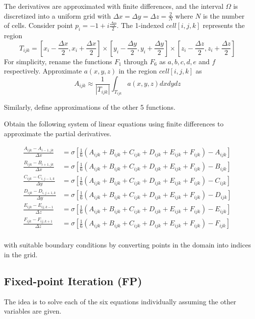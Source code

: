\documentclass[11pt,titlepage]{article}
\begin{document}
The derivatives are approximated with finite differences, and the interval $\Omega$ is discretized into a uniform grid
with $\Delta x = \Delta y = \Delta z = \frac{2}{N}$ where $N$ is the number of cells.
Consider point $p_i = -1 + i\frac{\Delta p}{2}$.
The 1-indexed $cell[i, j, k]$ represents the region
$$
T_{ijk} = [x_i - \frac{\Delta x}{2}, x_i + \frac{\Delta x}{2}] \times
[y_i - \frac{\Delta y}{2}, y_i + \frac{\Delta y}{2}] \times
[z_i - \frac{\Delta z}{2}, z_i + \frac{\Delta z}{2}]
$$
For simplicity, rename the functions $F_1$ through $F_6$ as $a, b, c, d, e$ and $f$ respectively. Approximate $a(x, y,
z)$ in the region $cell[i, j, k]$ as
$$A_{ijk} \approx \frac{1}{|T_{ijk}|}\int_{T_{ijk}} a(x, y, z)dxdydz$$

Similarly, define approximations of the other 5 functions.

Obtain the following system of linear equations using finite differences to approximate the partial derivatives.

\begin{align*}
    \frac{A_{ijk} - A_{i-1,jk}}{\Delta x} &=
    \sigma [\frac{1}{6}(A_{ijk} + B_{ijk} + C_{ijk} + D_{ijk} + E_{ijk} + F_{ijk}) - A_{ijk}] \\
    \frac{B_{ijk} - B_{i+1,jk}}{\Delta x} &=
    \sigma [\frac{1}{6}(A_{ijk} + B_{ijk} + C_{ijk} + D_{ijk} + E_{ijk} + F_{ijk}) - B_{ijk}] \\
    \frac{C_{ijk} - C_{i,j-1,k}}{\Delta y} &=
    \sigma [\frac{1}{6}(A_{ijk} + B_{ijk} + C_{ijk} + D_{ijk} + E_{ijk} + F_{ijk}) - C_{ijk}] \\
    \frac{D_{ijk} - D_{i,j+1,k}}{\Delta y} &=
    \sigma [\frac{1}{6}(A_{ijk} + B_{ijk} + C_{ijk} + D_{ijk} + E_{ijk} + F_{ijk}) - D_{ijk}] \\
    \frac{E_{ijk} - E_{ij,k-1}}{\Delta z} &=
    \sigma [\frac{1}{6}(A_{ijk} + B_{ijk} + C_{ijk} + D_{ijk} + E_{ijk} + F_{ijk}) - E_{ijk}] \\
    \frac{F_{ijk} - F_{ij,k+1}}{\Delta z} &=
    \sigma [\frac{1}{6}(A_{ijk} + B_{ijk} + C_{ijk} + D_{ijk} + E_{ijk} + F_{ijk}) - F_{ijk}] \\
\end{align*}

with suitable boundary conditions by converting points in the domain into indices in the grid.


\subsection{Fixed-point Iteration (FP)}
The idea is to solve each of the six equations individually assuming the other variables are given.
\end{document}
